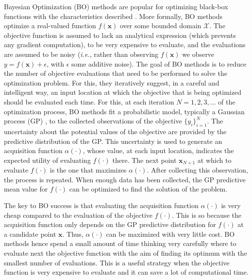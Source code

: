 Bayesian Optimization (BO) methods are popular for optimizing black-box functions \citep{shahriari2015taking} with 
the characteristics described \citep{mockus1978application}. More formally, BO methods optimize a real-valued 
function $f(\mathbf{x})$ over some bounded domain $\mathcal{X}$. 
The objective function is assumed to lack an analytical expression (which prevents any gradient computation),
to be very expensive to evaluate, and the evaluations are assumed to be noisy (\emph{i.e.}, rather than
observing $f(\mathbf{x})$ we observe $y = f(\mathbf{x}) + \epsilon$, with $\epsilon$ some additive noise). 
The goal of BO methods is to reduce the number of objective evaluations that need to be performed
to solve the optimization problem. For this, they iteratively suggest, in a careful and intelligent 
way, an input location at which the objective that is being optimized should be evaluated each time. 
For this, at each iteration $N=1,2,3,\ldots$ of the optimization process, BO methods fit a probabilistic 
model, typically a Gaussian process (GP) \citep{rasmussen2003gaussian}, to the collected observations of the 
objective $\{y_i\}_{i=1}^{N}$. The uncertainty about the potential values of the objective 
are provided by the predictive distribution of the GP. This uncertainty is used to generate an acquisition 
function $\alpha(\cdot)$, whose value, at each input location, indicates the expected utility 
of evaluating $f(\cdot)$ there. The next point $\mathbf{x}_{N+1}$ at which to evaluate $f(\cdot)$ is the 
one that maximizes $\alpha(\cdot)$. After collecting this observation, the process 
is repeated. When enough data has been collected, the GP predictive mean value 
for $f(\cdot)$ can be optimized to find the solution of the problem.

The key to BO success is that evaluating the acquisition function $\alpha(\cdot)$ is very cheap compared
to the evaluation of the objective $f(\cdot)$. This is so because the acquisition function only depends on 
the GP predictive distribution for $f(\cdot)$ at a candidate point $\mathbf{x}$. Thus, $\alpha(\cdot)$ can be 
maximized with very little cost. BO methods hence spend a small amount of time thinking very carefully where 
to evaluate next the objective function with the aim of finding its optimum with 
the smallest number of evaluations. This is a useful strategy when the objective function is very expensive 
to evaluate and it can save a lot of computational time. 

